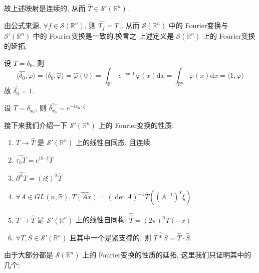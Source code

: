 \documentclass[11pt]{ctexart}[UTF8]
\begin{document}
故上述映射是连续的, 从而 $\widehat{T} \in \mathscr{S}'(\mathbb{R}^{n})$.\par
由公式来源, $\forall f \in \mathscr{S}(\mathbb{R}^{n})$, 则 $\widehat{T_{f}} = T_{\widehat{f}}$. 从而 $\mathscr{S}(\mathbb{R}^{n})$ 中的 Fourier变换与 $\mathscr{S}'(\mathbb{R}^{n})$ 中的 Fourier变换是一致的.换言之
上述定义是 $\mathscr{S}(\mathbb{R}^{n})$ 上的 Fourier变换的延拓.\par
\begin{example}
    设 $T = \delta_{0}$, 则 
    \begin{equation*}
        \langle \widehat{\delta_{0}}, \varphi \rangle = \langle \delta_{0}, \widehat{\varphi} \rangle = \widehat{\varphi}(0) = \int_{\mathbb{R}^{n}} e^{-i x \cdot 0} \varphi(x) \mathrm{d}x = \int_{\mathbb{R}^{n}} \varphi(x) \mathrm{d}x = \langle 1, \varphi \rangle
    \end{equation*}
    故 $\widehat{\delta_{0}} = 1$.\par
    设 $T = \delta_{x_{0}}$, 则 $\widehat{\delta_{x_{0}}} = e^{-i x_{0} \cdot \xi}$
\end{example}
接下来我们介绍一下 $\mathscr{S}'(\mathbb{R}^{n})$ 上的 Fourier变换的性质:
\begin{property}\leavevmode
    \begin{enumerate}
        \item $T \longrightarrow \widehat{T}$ 是 $\mathscr{S}'(\mathbb{R}^{n})$ 上的线性自同态, 且连续.
        \item $\widehat{\tau_{h}T} = e^{i h \cdot \xi} \widehat{T}$
        \item $\widehat{\partial^{\alpha}T} = (i\xi)^{\alpha} \widehat{T}$
        \item $\forall A \in GL(n, \mathbb{R}), \widehat{T(Ax)} = (\det A)^{-1} \widehat{T}((A^{-1})^{T}\xi)$
        \item $T \longrightarrow \widehat{T}$ 是 $\mathscr{S}'(\mathbb{R}^{n})$ 上的线性自同构. $\widehat{\widehat{T}} = (2\pi)^n T(-x)$
        \item $\forall T, S \in \mathscr{S}'(\mathbb{R}^{n})$ 且其中一个是紧支撑的, 则 $\widehat{T * S} = \widehat{T} \cdot \widehat{S}$.
    \end{enumerate}
\end{property}
由于大部分都是 $\mathscr{S}(\mathbb{R}^{n})$ 上的 Fourier变换的性质的延拓, 这里我们只证明其中的几个:
\end{document}
